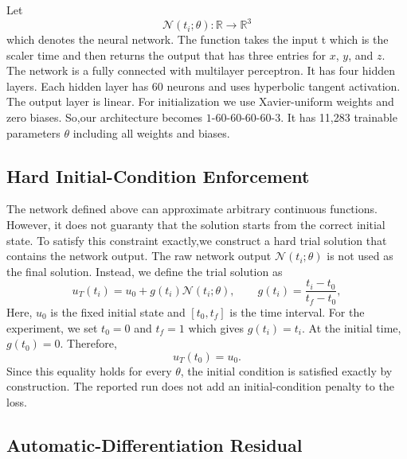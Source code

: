 Let
\begin{equation}
    \mathcal{N}(t_i;\theta):\mathbb{R}\rightarrow\mathbb{R}^{3}
    \label{eq:network-map}
\end{equation}
which denotes the neural network. The function takes the input t which is the scaler time and then returns the output that has three entries for $x$, $y$, and $z$. The network is a fully connected  with multilayer
perceptron. It has four hidden layers. Each hidden layer has 60 neurons and uses
 hyperbolic tangent activation. The output layer is linear. For initialization we use
Xavier-uniform weights and zero biases. So,our architecture becomes $1\text{-}60\text{-}60\text{-}60\text{-}60\text{-}3$. It has 11,283
trainable parameters $\theta$ including all weights and biases.

\subsection{Hard Initial-Condition Enforcement}

The network defined above can approximate arbitrary continuous
functions. However, it does not guaranty that the solution starts from
the correct initial state. To satisfy this constraint exactly,we construct a hard trial solution that contains the network output. The raw network output $\mathcal{N}(t_i;\theta)$ is not used as the final solution.
 Instead, we define the trial solution as
\begin{equation}
    u_T(t_i)=u_0+g(t_i)\mathcal{N}(t_i;\theta),
    \qquad
    g(t_i)=\frac{t_i-t_0}{t_f-t_0},
    \label{eq:trial-solution}
\end{equation}
Here, $u_0$ is the fixed initial state and $[t_0,t_f]$ is the time interval.
For the experiment, we set  $t_0=0$ and $t_f=1$ which gives $g(t_i)=t_i$. At the initial
time, $g(t_0)=0$. Therefore,
\begin{equation}
    u_T(t_0)=u_0.
    \label{eq:hard-ic}
\end{equation}
Since this equality holds for every \(\theta\), the initial condition is satisfied exactly by construction.
 The reported run does not add an initial-condition
penalty to the loss.

\subsection{Automatic-Differentiation Residual}

